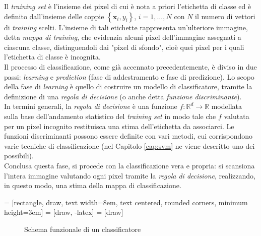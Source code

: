 Il \emph{training set} è l'insieme dei pixel di cui è nota a priori l'etichetta di classe ed è definito dall'insieme delle coppie $\left\lbrace \mathbf{x}_i,y_i \right\rbrace $, $i=1,\ldots,N$ con $N$ il numero di vettori di \emph{training} scelti. L'insieme di tali etichette rappresenta un'ulteriore immagine, detta  \emph{mappa di training}, che evidenzia alcuni pixel dell'immagine assegnati a ciascuna classe, distinguendoli dai "pixel di sfondo", cioè quei pixel per i quali l'etichetta di classe è incognita.
\\
Il processo di classificazione, come già accennato precedentemente, è diviso in due passi: \emph{learning} e \emph{prediction} (fase di addestramento e fase di predizione). Lo scopo della fase di \emph{learning} è quello di costruire un modello di classificatore, tramite la definizione di una \emph{regola di decisione} (o anche detta \emph{funzione discriminante}). \\
In termini generali, la \emph{regola di decisione} è una funzione $f:\mathbb{R}^d\rightarrow\mathbb{R}$ modellata sulla base dell'andamento statistico del \emph{training set} in modo tale che $f$ valutata per un pixel incognito restituisca una stima dell'etichetta da associarci. Le funzioni discriminanti possono essere definite con vari metodi, cui corrispondono varie tecniche di classificazione (nel Capitolo \ref{cap:svm} ne viene descritto uno dei possibili). \\
Conclusa questa fase, si procede con la classificazione vera e propria: si scansiona l'intera immagine valutando ogni pixel tramite la \emph{regola di decisione}, realizzando, in questo modo, una stima della mappa di classificazione.

 = [rectangle, draw, %
     text width=8em, text centered, rounded corners, minimum height=3em]
 = [draw, -latex]
 = [draw]


\begin{figure}[!ht]
\center
{}
    \caption{Schema funzionale di un classificatore}
    \label{fig:flowchart_classificatore}
  \end{figure}
\clearpage


